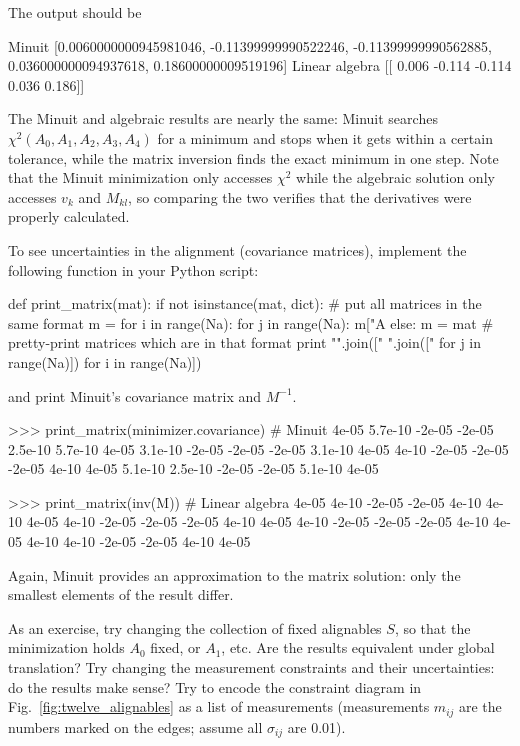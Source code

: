 \documentclass[12pt]{article}
\begin{document}
The output should be
\begin{python}
Minuit [0.0060000000945981046, -0.11399999990522246, -0.11399999990562885, 
                                0.036000000094937618, 0.18600000009519196]
Linear algebra [[ 0.006 -0.114 -0.114  0.036  0.186]]
\end{python}
The Minuit and algebraic results are nearly the same: Minuit searches
$\chi^2(A_0, A_1, A_2, A_3, A_4)$ for a minimum and stops when it gets
within a certain tolerance, while the matrix inversion finds the exact
minimum in one step.  Note that the Minuit minimization only accesses
$\chi^2$ while the algebraic solution only accesses $v_k$ and
$M_{kl}$, so comparing the two verifies that the derivatives were
properly calculated.

To see uncertainties in the alignment (covariance matrices), implement
the following function in your Python script:
\begin{python}
def print_matrix(mat):
    if not isinstance(mat, dict):  # put all matrices in the same format
        m = {}
        for i in range(Na):
            for j in range(Na):
                m["A%
    else:
        m = mat
    # pretty-print matrices which are in that format
    print "\n".join([" ".join(["%
                               for j in range(Na)]) for i in range(Na)])
\end{python}
and print Minuit's covariance matrix and $M^{-1}$.
\begin{python}
>>> print_matrix(minimizer.covariance)  # Minuit
   4e-05  5.7e-10   -2e-05   -2e-05  2.5e-10
 5.7e-10    4e-05  3.1e-10   -2e-05   -2e-05
  -2e-05  3.1e-10    4e-05    4e-10   -2e-05
  -2e-05   -2e-05    4e-10    4e-05  5.1e-10
 2.5e-10   -2e-05   -2e-05  5.1e-10    4e-05

>>> print_matrix(inv(M))  # Linear algebra
   4e-05    4e-10   -2e-05   -2e-05    4e-10
   4e-10    4e-05    4e-10   -2e-05   -2e-05
  -2e-05    4e-10    4e-05    4e-10   -2e-05
  -2e-05   -2e-05    4e-10    4e-05    4e-10
   4e-10   -2e-05   -2e-05    4e-10    4e-05
\end{python}
Again, Minuit provides an approximation to the matrix solution: only
the smallest elements of the result differ.

As an exercise, try changing the collection of fixed alignables $S$,
so that the minimization holds $A_0$ fixed, or $A_1$, etc.  Are the
results equivalent under global translation?  Try changing the
measurement constraints and their uncertainties: do the results make
sense?  Try to encode the constraint diagram in
Fig.~\ref{fig:twelve_alignables} as a list of measurements
(measurements $m_{ij}$ are the numbers marked on the edges; assume all
$\sigma_{ij}$ are 0.01).
\end{document}
